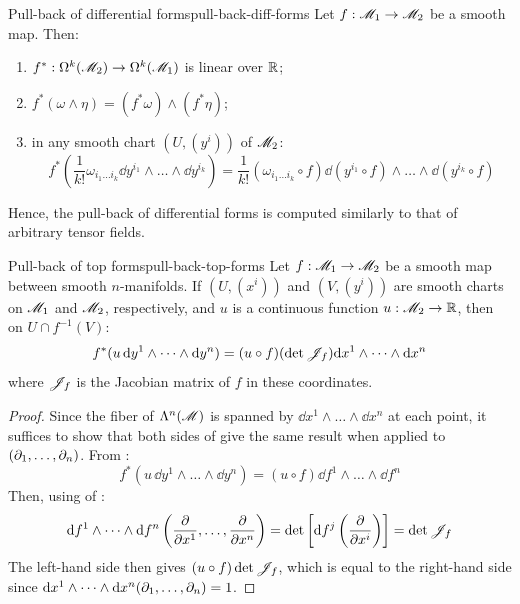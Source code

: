 \begin{lemma}{Pull-back of differential forms}{pull-back-diff-forms}
  Let $ f : \mathscr{M}_1 \rightarrow \mathscr{M}_2 $ be a smooth map. Then:
  \begin{enumerate}
    \item \label{item:pbdf-1} $ f^* : \Omega^{k}(\mathscr{M}_2) \rightarrow \Omega^{k}(\mathscr{M}_1) $ is linear over $ \mathbb{R} $;
    \item \label{item:pbdf-2} $ f^*(\omega \wedge \eta) = (f^*\omega) \wedge (f^*\eta) $;
    \item \label{item:pbdf-3} in any smooth chart $ (U,(y^i)) $ of $ \mathscr{M}_2 $:
      \begin{equation}
        f^*\left( \frac{1}{k!} \omega_{i_1 \dots i_k} \dd y^{i_1} \wedge \dots \wedge \dd y^{i_k} \right) = \frac{1}{k!} (\omega_{i_1 \dots i_k} \circ f) \dd (y^{i_1} \circ f) \wedge \dots \wedge \dd (y^{i_k} \circ f)
      \end{equation}
  \end{enumerate}
\end{lemma}

Hence, the pull-back of differential forms is computed similarly to that of arbitrary tensor fields.

\begin{proposition}{Pull-back of top forms}{pull-back-top-forms}
  Let $ f : \mathscr{M}_1 \rightarrow \mathscr{M}_2 $ be a smooth map between smooth $ n $-manifolds. If $ (U,(x^i)) $ and $ (V,(y^i)) $ are smooth charts on $ \mathscr{M}_1 $ and $ \mathscr{M}_2 $, respectively, and $ u $ is a continuous function $ u : \mathscr{M}_2 \rightarrow \mathbb{R} $, then on $ U \cap f^{-1}(V) $:
  \begin{equation}
    f^*(u \, \mathrm{d} y^1 \wedge \dots \wedge \mathrm{d} y^n) = (u \circ f) (\det \mathscr{J}_{f}) \mathrm{d} x^1 \wedge \dots \wedge \mathrm{d} x^n
    \label{eq:jacobian}
  \end{equation}
  where $ \mathscr{J}_{f} $ is the Jacobian matrix of $ f $ in these coordinates.
\end{proposition}

\begin{proofbox}
  \begin{proof}
    Since the fiber of $ \Lambda^{n}(\mathscr{M}) $ is spanned by $ \dd x^1 \wedge \dots \wedge \dd x^n $ at each point, it suffices to show that both sides of  give the same result when applied to $ (\partial_1 , \dots , \partial_n) $. From :
    \begin{equation*}
      f^*(u \, \dd y^1 \wedge \dots \wedge \dd y^n) = (u \circ f) \dd f^1 \wedge \dots \wedge \dd f^n
    \end{equation*}
    Then, using  of :
    \begin{equation*}
      \mathrm{d} f^1 \wedge \dots \wedge \mathrm{d} f^n \left( \frac{\partial}{\partial x^1} , \dots , \frac{\partial}{\partial x^n} \right) = \det \left[ \mathrm{d} f^j \left( \frac{\partial}{\partial x^i} \right) \right] = \det \mathscr{J}_{f}
    \end{equation*}
    The left-hand side then gives $ (u \circ f) \det \mathscr{J}_{f} $, which is equal to the right-hand side since $ \mathrm{d} x^1 \wedge \dots \wedge \mathrm{d} x^n (\partial_1 , \dots , \partial_n) = 1 $.
  \end{proof}
\end{proofbox}

